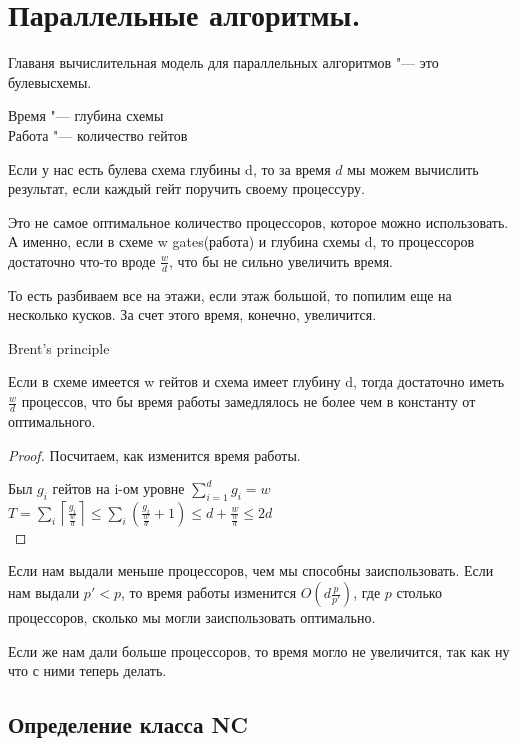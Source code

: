 ﻿\section{Параллельные алгоритмы.}

Главаня вычислительная модель для параллельных алгоритмов "--- это булевысхемы. 

\begin{Def}
	Время "--- глубина схемы\\
	Работа "--- количество гейтов\\
\end{Def}

Если у нас есть булева схема глубины d, то за время $d$ мы можем вычислить результат, если 
каждый гейт поручить своему процессуру. 

Это не самое оптимальное количество процессоров, которое можно использовать. А именно,
если в схеме w gates(работа) и глубина схемы d, то процессоров достаточно что-то вроде $\frac{w}{d}$, что бы 
не сильно увеличить время. 

То есть разбиваем все на этажи, если этаж большой, то попилим еще на несколько кусков. За счет этого
время, конечно, увеличится. 

\begin{theorem}
	Brent's principle

	Если в схеме имеется w гейтов и схема имеет глубину d, тогда достаточно иметь $\frac{w}{d}$ процессов, 
	что бы время работы замедлялось не более чем в константу от оптимального. 
\end{theorem}
\begin{proof}
	Посчитаем, как изменится время работы.

	Был $g_i$ гейтов на i-ом уровне $\sum_{i = 1}^{d} g_i = w$\\
	$T = \sum_{i} \left \lceil \frac{g_i}{\frac{w}{d}} \right \rceil \le \sum_i (\frac{g_i}{\frac{w}{d}} + 1)
	\le d + \frac{w}{\frac{w}{d}} \le 2d$\\
\end{proof}

Если нам выдали меньше процессоров, чем мы способны заиспользовать. Если нам выдали $p' < p$, 
то время работы изменится $O(d\frac{p}{p'})$,  где $p$ столько процессоров, сколько мы могли заиспользовать
оптимально. 

Если же нам дали больше процессоров, то время могло не увеличится, так как ну что с ними теперь делать.

\subsection{Определение класса NC}


